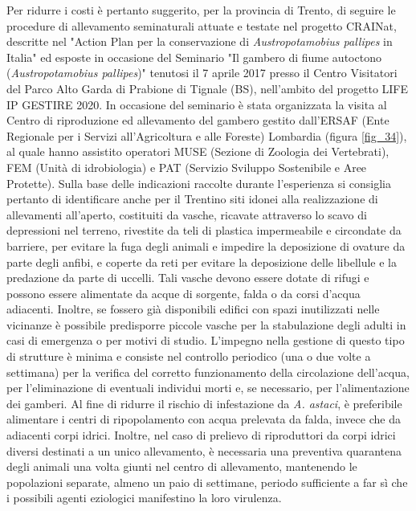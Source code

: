 \documentclass[11pt,a4paper,italian,twoside,openany]{memoir}
\begin{document}
Per ridurre i costi è pertanto suggerito, per la provincia di Trento, di seguire le procedure di allevamento seminaturali attuate e testate nel progetto CRAINat, descritte nel "Action Plan per la conservazione di \emph{Austropotamobius pallipes} in Italia" \cite{AA.VV. 2014} ed esposte in occasione del Seminario "Il gambero di fiume autoctono (\emph{Austropotamobius pallipes})" tenutosi il 7 aprile 2017 presso il Centro Visitatori del Parco Alto Garda di Prabione di Tignale (BS), nell'ambito del progetto LIFE IP GESTIRE 2020. In occasione del seminario è stata organizzata la visita al Centro di riproduzione ed allevamento del gambero gestito dall'ERSAF (Ente Regionale per i Servizi all'Agricoltura e alle Foreste) Lombardia (figura \ref{fig_34}), al quale hanno assistito operatori MUSE (Sezione di Zoologia dei Vertebrati), FEM (Unità di idrobiologia) e PAT (Servizio Sviluppo Sostenibile e Aree Protette). Sulla base delle indicazioni raccolte durante l'esperienza si consiglia pertanto di identificare anche per il Trentino siti idonei alla realizzazione di allevamenti all'aperto, costituiti da vasche, ricavate attraverso lo scavo di depressioni nel terreno, rivestite da teli di plastica impermeabile e circondate da barriere, per evitare la fuga degli animali e impedire la deposizione di ovature da parte degli anfibi, e coperte da reti per evitare la deposizione delle libellule e la predazione da parte di uccelli. Tali vasche devono essere dotate di rifugi e possono essere alimentate da acque di sorgente, falda o da corsi d'acqua adiacenti. Inoltre, se fossero già disponibili edifici con spazi inutilizzati nelle vicinanze è possibile predisporre piccole vasche per la stabulazione degli adulti in casi di emergenza o per motivi di studio. L'impegno nella gestione di questo tipo di strutture è minima e consiste nel controllo periodico (una o due volte a settimana) per la verifica del corretto funzionamento della circolazione dell'acqua, per l'eliminazione di eventuali individui morti e, se necessario, per l'alimentazione dei gamberi. Al fine di ridurre il rischio di infestazione da \emph{A. astaci}, è preferibile alimentare i centri di ripopolamento con acqua prelevata da falda, invece che da adiacenti corpi idrici. Inoltre, nel caso di prelievo di riproduttori da corpi idrici diversi destinati a un unico allevamento, è necessaria una preventiva quarantena degli animali una volta giunti nel centro di allevamento, mantenendo le popolazioni separate, almeno un paio di settimane, periodo sufficiente a far sì che i possibili agenti eziologici manifestino la loro virulenza.
\end{document}

